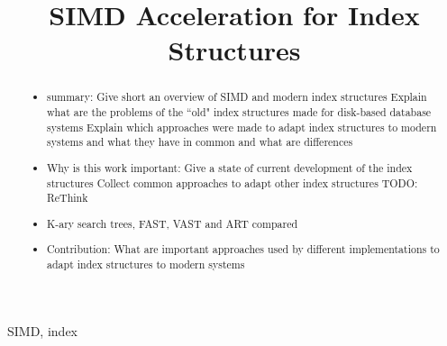 \documentclass[conference]{IEEEtran}
\begin{document}
\title{SIMD Acceleration for Index Structures\\
}

\author{
}

\maketitle

\begin{abstract}
\begin{itemize}
	\item summary: 
	\subitem Give short an overview of SIMD and modern index structures
	\subitem Explain what are the problems of the ``old" index structures made for disk-based database systems
	\subitem Explain which approaches were made to adapt index structures to modern systems and what they have in common and what are differences
	\item Why is this work important: 
	\subitem Give a state of current development of the index structures
	\subitem Collect common approaches to adapt other index structures TODO: ReThink
	\item K-ary search trees, FAST, VAST and ART compared
	\item Contribution: What are important approaches used by different implementations to adapt index structures to modern systems
\end{itemize}
\end{abstract}

\begin{IEEEkeywords}
SIMD, index 
\end{IEEEkeywords}
\end{document}
